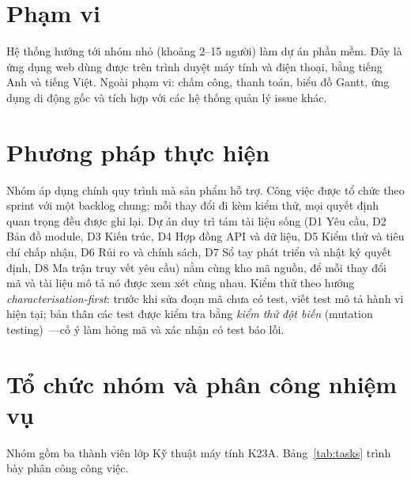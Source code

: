 \documentclass[../main.tex]{subfiles}
\begin{document}
\section{Phạm vi}
Hệ thống hướng tới nhóm nhỏ (khoảng 2--15 người) làm dự án phần mềm. Đây là ứng dụng web dùng được
trên trình duyệt máy tính và điện thoại, bằng tiếng Anh và tiếng Việt. Ngoài phạm vi: chấm công,
thanh toán, biểu đồ Gantt, ứng dụng di động gốc và tích hợp với các hệ thống quản lý issue khác.

\section{Phương pháp thực hiện}
Nhóm áp dụng chính quy trình mà sản phẩm hỗ trợ. Công việc được tổ chức theo sprint với một backlog
chung; mỗi thay đổi đi kèm kiểm thử, mọi quyết định quan trọng đều được ghi lại. Dự án duy trì tám
tài liệu sống (D1 Yêu cầu, D2 Bản đồ module, D3 Kiến trúc, D4 Hợp đồng API và dữ liệu, D5 Kiểm thử và
tiêu chí chấp nhận, D6 Rủi ro và chính sách, D7 Sổ tay phát triển và nhật ký quyết định, D8 Ma trận
truy vết yêu cầu) nằm cùng kho mã nguồn, để mỗi thay đổi mã và tài liệu mô tả nó được xem xét cùng
nhau. Kiểm thử theo hướng \emph{characterisation-first}: trước khi sửa đoạn mã chưa có test, viết
test mô tả hành vi hiện tại; bản thân các test được kiểm tra bằng \emph{kiểm thử đột biến} (mutation
testing)~\cite{demillo1978mutation}---cố ý làm hỏng mã và xác nhận có test báo lỗi.

\section{Tổ chức nhóm và phân công nhiệm vụ}
Nhóm gồm ba thành viên lớp Kỹ thuật máy tính K23A. Bảng~\ref{tab:tasks} trình bày phân công công việc.
\end{document}

